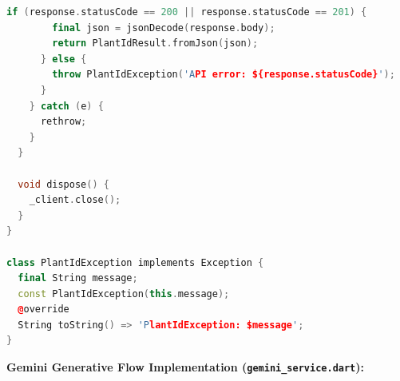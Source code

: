 \begin{lstlisting}[language=C++]
      if (response.statusCode == 200 || response.statusCode == 201) {
        final json = jsonDecode(response.body);
        return PlantIdResult.fromJson(json);
      } else {
        throw PlantIdException('API error: ${response.statusCode}');
      }
    } catch (e) {
      rethrow;
    }
  }

  void dispose() {
    _client.close();
  }
}

class PlantIdException implements Exception {
  final String message;
  const PlantIdException(this.message);
  @override
  String toString() => 'PlantIdException: $message';
}
\end{lstlisting}

\vspace{1cm}

\textbf{Gemini Generative Flow Implementation (\texttt{gemini\_service.dart}):}
